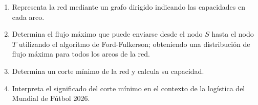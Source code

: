 \begin{enumerate}
    \item Representa la red mediante un grafo dirigido indicando las capacidades en cada arco.

    \item Determina el flujo máximo que puede enviarse desde el nodo  $S$ hasta el nodo  $T$ utilizando el algoritmo de Ford-Fulkerson; obteniendo una distribución de flujo máxima para todos los arcos de la red.

    \item Determina un corte mínimo de la red y calcula su capacidad.

    \item Interpreta el significado del corte mínimo en el contexto de la logística del Mundial de Fútbol 2026.
\end{enumerate}